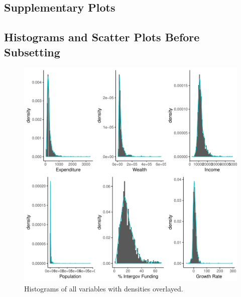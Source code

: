 \documentclass{article}\usepackage[]{graphicx}\usepackage[]{color}
\makeatletter
\def\maxwidth{ %
  \ifdim\Gin@nat@width>\linewidth
    \linewidth
  \else
    \Gin@nat@width
  \fi
}
\newenvironment{knitrout}{}{} %
\makeatother
\begin{document}
\newpage
\begin{appendices}

\section{Supplementary Plots} \label{appendix_plots}

\subsection{Histograms and Scatter Plots Before Subsetting} \label{append-before-subset}

\begin{knitrout}
\color{fgcolor}\begin{figure}[h!]
\includegraphics[width=\maxwidth]{figure/r_append_hist-1} \caption[Histograms of all variables with densities overlayed]{Histograms of all variables with densities overlayed.}\label{fig:r append_hist}
\end{figure}


\end{knitrout}




\end{appendices}
\end{document}
